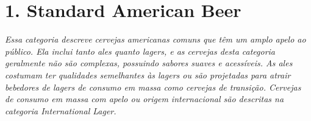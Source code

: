 \section*{1. Standard American Beer}
\textit{Essa categoria descreve cervejas americanas comuns que têm um amplo apelo ao público. Ela inclui tanto ales quanto lagers, e as cervejas desta categoria geralmente não são complexas, possuindo sabores suaves e acessíveis. As ales costumam ter qualidades semelhantes às lagers ou são projetadas para atrair bebedores de lagers de consumo em massa como cervejas de transição. Cervejas de consumo em massa com apelo ou origem internacional são descritas na categoria International Lager.}